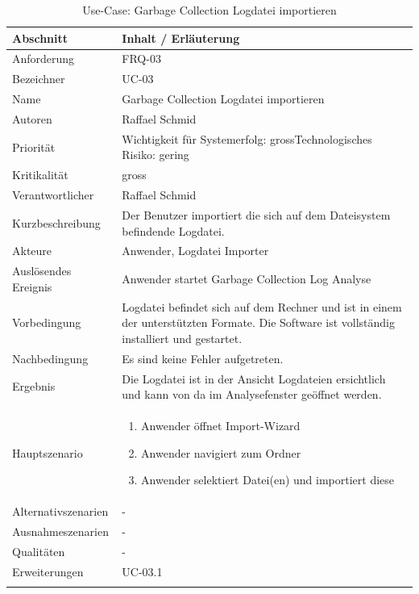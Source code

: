 \begin{longtable}{|p{4cm}|p{10.5cm}|}
\hline
   \textbf{Abschnitt} & \textbf{Inhalt / Erläuterung} \\\hline
   Anforderung & FRQ-03\\\hline
   Bezeichner & UC-03\\\hline
   Name & Garbage Collection Logdatei importieren\\\hline
   Autoren & Raffael Schmid\\\hline
   Priorität & Wichtigkeit für Systemerfolg: gross\newline Technologisches Risiko: gering\\\hline
   Kritikalität & gross\\\hline
   Verantwortlicher & Raffael Schmid\\\hline
   Kurzbeschreibung & Der Benutzer importiert die sich auf dem Dateisystem befindende Logdatei.\\\hline
   Akteure & Anwender, Logdatei Importer\\\hline
   Auslösendes Ereignis & Anwender startet Garbage Collection Log Analyse\\\hline
   Vorbedingung & Logdatei befindet sich auf dem Rechner und ist in einem der unterstützten Formate. Die Software ist vollständig installiert und gestartet.\\\hline
   Nachbedingung & Es sind keine Fehler aufgetreten. \\\hline
   Ergebnis & Die Logdatei ist in der Ansicht Logdateien ersichtlich und kann von da im Analysefenster geöffnet werden.\\\hline
   Hauptszenario & 
	\begin{enumerate}
		\item Anwender öffnet Import-Wizard
		\item Anwender navigiert zum Ordner
		\item Anwender selektiert Datei(en) und importiert diese
	\end{enumerate}
	\\\hline
   Alternativszenarien & -\\\hline
   Ausnahmeszenarien & -\\\hline
   Qualitäten & -\\\hline
   Erweiterungen & UC-03.1\\\hline
\caption{Use-Case: Garbage Collection Logdatei importieren}
\end{longtable}


